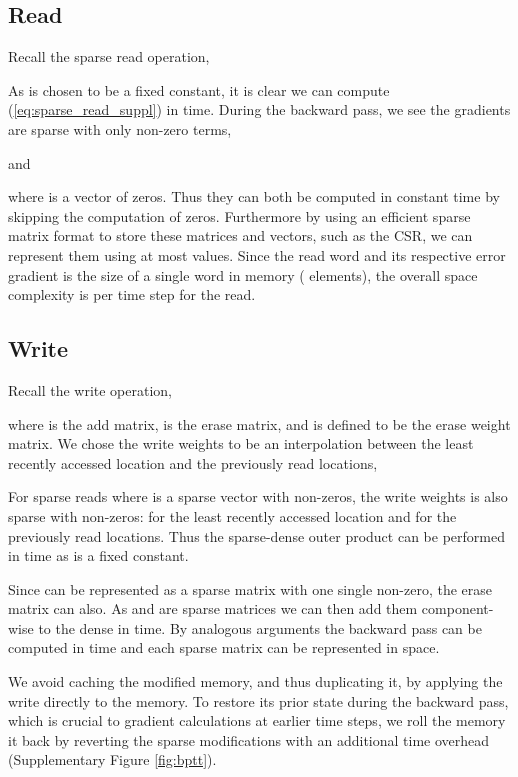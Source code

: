 \documentclass{article}
\begin{document}
\subsection{Read}
Recall the sparse read operation,



As  is chosen to be a fixed constant, it is clear we can compute (\ref{eq:sparse_read_suppl}) in  time. During the backward pass, we see the gradients are sparse with only  non-zero terms,

and

where  is a vector of  zeros. Thus they can both be computed in constant time by skipping the computation of zeros. Furthermore by using an efficient sparse matrix format to store these matrices and vectors, such as the CSR, we can represent them using at most  values. Since the read word  and its respective error gradient is the size of a single word in memory ( elements), the overall space complexity is  per time step for the read.

\subsection{Write}
Recall the write operation,



where  is the add matrix,  is the erase matrix, and  is defined to be the erase weight matrix. We chose the write weights to be an interpolation between the least recently accessed location and the previously read locations,



For sparse reads where  is a sparse vector with  non-zeros, the write weights  is also sparse with  non-zeros:  for the least recently accessed location and  for the previously read locations. Thus the sparse-dense outer product  can be performed in  time as  is a fixed constant.

Since  can be represented as a sparse matrix with one single non-zero, the erase matrix  can also. As  and  are sparse matrices we can then add them component-wise to the dense  in  time. By analogous arguments the backward pass can be computed in  time and each sparse matrix can be represented in  space.

We avoid caching the modified memory, and thus duplicating it, by applying the write directly to the memory. To restore its prior state during the backward pass, which is crucial to gradient calculations at earlier time steps, we roll the memory it back by reverting the sparse modifications with an additional  time overhead (Supplementary Figure \ref{fig:bptt}).
\end{document}
